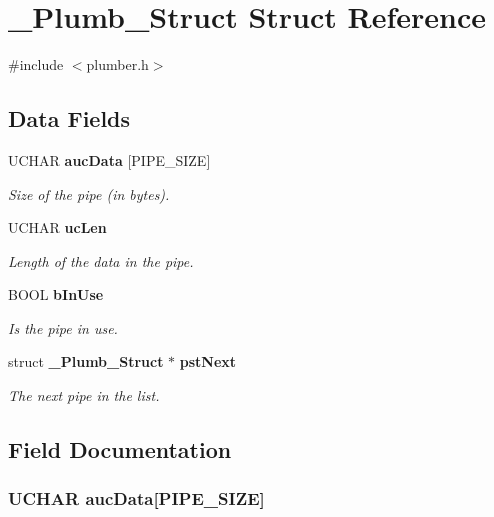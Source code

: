 \section{\_\-Plumb\_\-Struct Struct Reference}
\label{struct___plumb___struct}


{\ttfamily \#include $<$plumber.h$>$}\subsection*{Data Fields}
\begin{DoxyCompactItemize}
\item 
UCHAR {\bf aucData} [PIPE\_\-SIZE]
\begin{DoxyCompactList}\small\item\em Size of the pipe (in bytes). \item\end{DoxyCompactList}\item 
UCHAR {\bf ucLen}
\begin{DoxyCompactList}\small\item\em Length of the data in the pipe. \item\end{DoxyCompactList}\item 
BOOL {\bf bInUse}
\begin{DoxyCompactList}\small\item\em Is the pipe in use. \item\end{DoxyCompactList}\item 
struct {\bf \_\-Plumb\_\-Struct} $\ast$ {\bf pstNext}
\begin{DoxyCompactList}\small\item\em The next pipe in the list. \item\end{DoxyCompactList}\end{DoxyCompactItemize}


\subsection{Field Documentation}
\subsubsection[{aucData}]{\setlength{\rightskip}{0pt plus 5cm}UCHAR {\bf aucData}[PIPE\_\-SIZE]}\label{struct___plumb___struct_a66e34d3235dd6be05133b7464777cd19}


